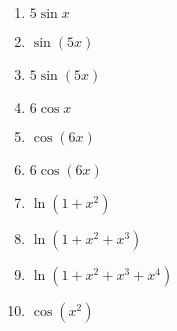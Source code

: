 \documentclass{article}
\begin{document}
\begin{multicols}{2}
\begin{enumerate}
    \item $5\sin x$
    \item $\sin(5x)$
    \item $5\sin(5x)$
    \item $6\cos x$
    \item $\cos(6x)$
    \item $6\cos(6x)$
    \item $\ln(1+x^2)$
    \item $\ln(1+x^2+x^3)$
    \item $\ln(1+x^2+x^3+x^4)$
    \item $\cos(x^2)$
\end{enumerate}
\end{multicols}
\end{document}
